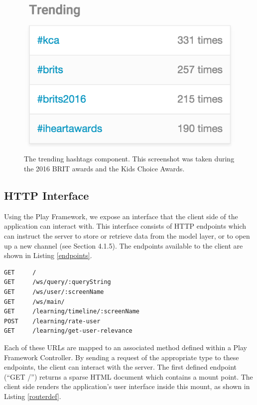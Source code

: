 \documentclass{l4proj}
\begin{document}
\begin{figure}
\centering
\includegraphics[scale=0.75]{trending.png}
\caption{The trending hashtags component. This screenshot was taken during the 2016 BRIT awards and the Kids Choice Awards.}
\label{trending}
\end{figure}
                       
    \subsection{HTTP Interface}
    Using the Play Framework, we expose an interface that the client side of the application can interact with. This interface consists of HTTP endpoints which can instruct the server to store or retrieve data from the model layer, or to open up a new channel (see Section 4.1.5). The endpoints available to the client are shown in Listing \ref{endpoints}.
    
\begin{lstlisting}[label=endpoints,caption=The exposed interface of the server.]
GET     /
GET     /ws/query/:queryString                      
GET     /ws/user/:screenName                        
GET     /ws/main/                      
GET     /learning/timeline/:screenName              
POST    /learning/rate-user                         
GET     /learning/get-user-relevance                
\end{lstlisting}

Each of these URLs are mapped to an associated method defined within a Play Framework Controller. By sending a request of the appropriate type to these endpoints, the client can interact with the server. The first defined endpoint (``GET /'') returns a sparse HTML document which contains a mount point. The client side renders the application's user interface inside this mount, as shown in Listing \ref{routerdef}.
\end{document}
